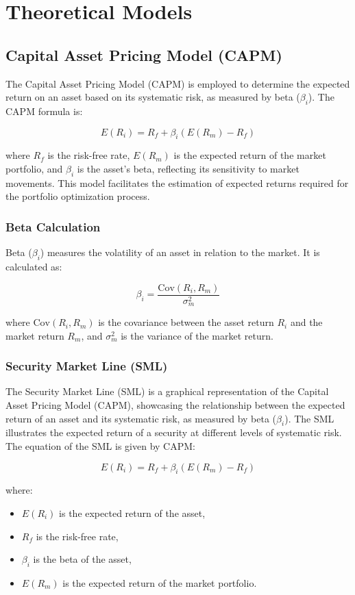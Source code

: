 \section{Theoretical Models}
\subsection{Capital Asset Pricing Model (CAPM)}
The Capital Asset Pricing Model (CAPM) is employed to determine the expected return on an asset based on its systematic risk, as measured by beta ($\beta_i$). The CAPM formula is:

\[
E(R_i) = R_f + \beta_i (E(R_m) - R_f)
\]

where \( R_f \) is the risk-free rate, \( E(R_m) \) is the expected return of the market portfolio, and \( \beta_i \) is the asset’s beta, reflecting its sensitivity to market movements. This model facilitates the estimation of expected returns required for the portfolio optimization process.

\subsubsection{Beta Calculation}
Beta ($\beta_i$) measures the volatility of an asset in relation to the market. It is calculated as:

\[
\beta_i = \frac{\text{Cov}(R_i, R_m)}{\sigma^2_m}
\]

where \(\text{Cov}(R_i, R_m)\) is the covariance between the asset return \( R_i \) and the market return \( R_m \), and \( \sigma^2_m \) is the variance of the market return.

\subsubsection{Security Market Line (SML)}
The Security Market Line (SML) is a graphical representation of the Capital Asset Pricing Model (CAPM), showcasing the relationship between the expected return of an asset and its systematic risk, as measured by beta ($\beta_i$). The SML illustrates the expected return of a security at different levels of systematic risk. The equation of the SML is given by CAPM:

\[
E(R_i) = R_f + \beta_i (E(R_m) - R_f)
\]

where:
\begin{itemize}
    \item \( E(R_i) \) is the expected return of the asset,
    \item \( R_f \) is the risk-free rate,
    \item \( \beta_i \) is the beta of the asset,
    \item \( E(R_m) \) is the expected return of the market portfolio.
\end{itemize}

